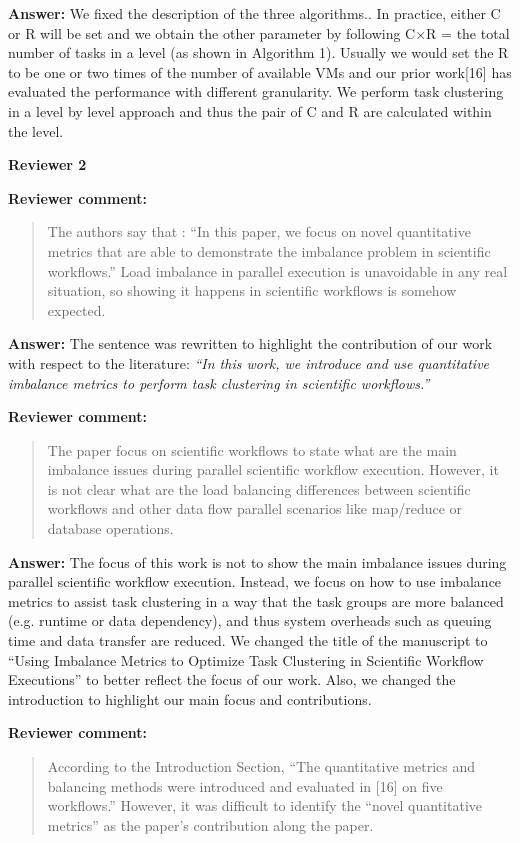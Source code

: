\documentclass{letter}
\newenvironment{review}%
{\textbf{Reviewer comment:}\begin{quote}}%
{\end{quote}}%
\newcommand{\answer}[1]{%
      \textbf{Answer:} #1}
\newcommand{\revised}[1]{\emph{#1}\color{black}}
\begin{document}
\begin{letter}{}
\answer{We fixed the description of the three algorithms.. In practice, either C or R will be set and we {obtain } the other parameter by following C$\times$R = the total number of tasks in a level (as shown in Algorithm 1). Usually we would set the R to be one or two times of the number of available VMs and our prior work[16] has evaluated the performance with different {granularity. }We perform task clustering in a level by level approach and thus the pair of C and R are calculated within the level.}


\newpage

\textbf{Reviewer 2}


\begin{review}
The authors say that : ``In this paper, we focus on novel quantitative metrics that are able to demonstrate the imbalance problem in scientific workflows.'' Load imbalance in parallel execution is unavoidable in any real situation, so showing it happens in scientific workflows is somehow expected.
\end{review}

\answer{The sentence was rewritten to highlight the contribution of our work with respect to the literature:
\revised{``In this work, we introduce and use quantitative imbalance metrics to perform task clustering in scientific workflows.''}}


\begin{review}
The paper focus on scientific workflows to state what are the main imbalance issues during parallel scientific workflow execution. However, it is not clear what are the load balancing differences between scientific workflows and other data flow parallel scenarios like map/reduce or database operations.
\end{review}

\answer{{T}he focus of this work is not to show the main imbalance issues during parallel scientific workflow execution. Instead, we focus on how to use imbalance metrics to assist task clustering in a way that the task groups are more balanced (e.g. runtime or data dependency), and thus system overheads such as queuing time and data transfer are reduced. We changed the title of the manuscript to ``Using Imbalance Metrics to Optimize Task Clustering in Scientific Workflow Executions'' to better reflect the focus of our work. Also, we changed {the }introduction to highlight our main focus and contributions.}


\begin{review}
According to the Introduction Section, ``The quantitative metrics and balancing methods were introduced and evaluated in [16] on five workflows.'' However, it was difficult to identify the ``novel quantitative metrics'' as the paper's contribution along the paper. 
\end{review}


\end{letter}
\end{document}
